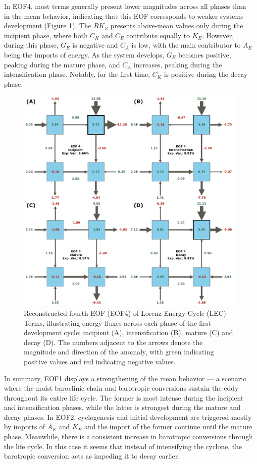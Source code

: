 In EOF4, most terms generally present lower magnitudes across all phases than in the mean behavior, indicating that this EOF corresponds to weaker systems development (Figure \ref{fig:eof4_phases}). The $RK_Z$ presents above-mean values only during the incipient phase, where both $C_K$ and $C_E$ contribute equally to $K_E$. However, during this phase, $G_E$ is negative and $C_A$ is low, with the main contributor to $A_E$ being the imports of energy. As the system develops, $G_E$ becomes positive, peaking during the mature phase, and $C_A$ increases, peaking during the intensification phase. Notably, for the first time, $C_K$ is positive during the decay phase.

\begin{figure}[!htbp]
\centering
\includegraphics[width=\textwidth]{figs_5/eof4_phases_reconstructed.pdf}
\caption[Reconstructed EOF4 - Phases]{Reconstructed fourth EOF (EOF4) of Lorenz Energy Cycle (LEC) Terms, illustrating energy fluxes across each phase of the first development cycle: incipient (A), intensification (B), mature (C) and decay (D).  The numbers adjacent to the arrows denote the magnitude and direction of the anomaly, with green indicating positive values and red indicating negative values.}
\label{fig:eof4_phases}
\end{figure}

In summary, EOF1 displays a strengthening of the mean behavior — a scenario where the moist baroclinic chain and barotropic conversions sustain the eddy throughout its entire life cycle. The former is most intense during the incipient and intensification phases, while the latter is strongest during the mature and decay phases. In EOF2, cyclogenesis and initial development are triggered mostly by imports of $A_E$ and $K_E$ and the import of the former continue until the mature phase. Meanwhile, there is a consistent increase in barotropic conversions through the life cycle. In this case it seems that instead of intensifying the cyclone, the barotropic conversion acts as impeding it to decay earlier.  

